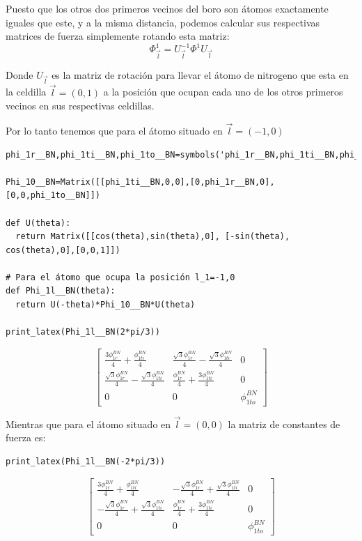 \documentclass[12pt,a4paper]{article}
\begin{document}
Puesto que los otros dos primeros vecinos del boro son átomos exactamente iguales que este, y a la misma distancia, podemos calcular sus respectivas matrices de fuerza simplemente rotando esta matriz:
\begin{equation}
\label{eq:2}
\Phi^1_{\vec l}=U_{\vec l}^{-1}\Phi^1U_{\vec l}
\end{equation}

Donde \(U_{\vec l}\) es la matriz de rotación para llevar el átomo de nitrogeno que esta en la celdilla \(\vec l=(0, 1)\) a la posición que ocupan cada uno de los otros primeros vecinos en sus respectivas celdillas.

Por lo tanto tenemos que para el átomo situado en \(\vec l=(-1,0)\)
\begin{verbatim}
phi_1r__BN,phi_1ti__BN,phi_1to__BN=symbols('phi_1r__BN,phi_1ti__BN,phi_1to__BN')

Phi_10__BN=Matrix([[phi_1ti__BN,0,0],[0,phi_1r__BN,0],[0,0,phi_1to__BN]])

def U(theta):
  return Matrix([[cos(theta),sin(theta),0], [-sin(theta), cos(theta),0],[0,0,1]])

# Para el átomo que ocupa la posición l_1=-1,0
def Phi_1l__BN(theta):
  return U(-theta)*Phi_10__BN*U(theta)

print_latex(Phi_1l__BN(2*pi/3))
\end{verbatim}

\begin{equation}
\label{eq:11}
\left[\begin{matrix}\frac{3 \phi^{BN}_{1r}}{4} + \frac{\phi^{BN}_{1ti}}{4} & \frac{\sqrt{3} \phi^{BN}_{1r}}{4} - \frac{\sqrt{3} \phi^{BN}_{1ti}}{4} & 0\\\frac{\sqrt{3} \phi^{BN}_{1r}}{4} - \frac{\sqrt{3} \phi^{BN}_{1ti}}{4} & \frac{\phi^{BN}_{1r}}{4} + \frac{3 \phi^{BN}_{1ti}}{4} & 0\\0 & 0 & \phi^{BN}_{1to}\end{matrix}\right]
\end{equation}

Mientras que para el átomo situado en \(\vec l= (0,0)\) la matriz de constantes de fuerza es:

\begin{verbatim}
print_latex(Phi_1l__BN(-2*pi/3))
\end{verbatim}

\begin{equation}
 \left[\begin{matrix}\frac{3 \phi^{BN}_{1r}}{4} + \frac{\phi^{BN}_{1ti}}{4} & - \frac{\sqrt{3} \phi^{BN}_{1r}}{4} + \frac{\sqrt{3} \phi^{BN}_{1ti}}{4} & 0\\- \frac{\sqrt{3} \phi^{BN}_{1r}}{4} + \frac{\sqrt{3} \phi^{BN}_{1ti}}{4} & \frac{\phi^{BN}_{1r}}{4} + \frac{3 \phi^{BN}_{1ti}}{4} & 0\\0 & 0 & \phi^{BN}_{1to}\end{matrix}\right]
\end{equation}
\end{document}
